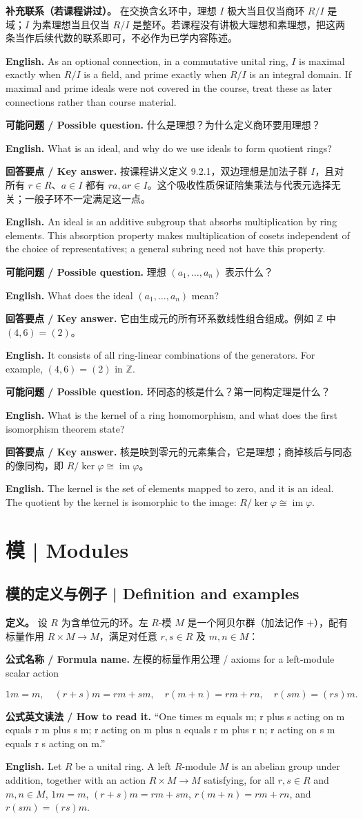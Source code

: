 \documentclass[UTF8,11pt,a4paper]{ctexart}
\newcommand{\EN}[1]{\par\noindent\textbf{English.} #1\par}
\newcommand{\READ}[1]{\par\noindent\textbf{公式英文读法 / How to read it.} #1\par}
\newcommand{\FORMULA}[2]{\par\noindent\textbf{公式名称 / Formula name.} #1 / #2\par}
\newcommand{\ASK}[4]{\par\noindent\textbf{可能问题 / Possible question.} #1\par\EN{#2}\noindent\textbf{回答要点 / Key answer.} #3\par\EN{#4}\medskip}
\begin{document}
\noindent\textbf{补充联系（若课程讲过）。} 在交换含幺环中，理想 $I$ 极大当且仅当商环 $R/I$ 是域；$I$ 为素理想当且仅当 $R/I$ 是整环。若课程没有讲极大理想和素理想，把这两条当作后续代数的联系即可，不必作为已学内容陈述。
\EN{As an optional connection, in a commutative unital ring, $I$ is maximal exactly when $R/I$ is a field, and prime exactly when $R/I$ is an integral domain. If maximal and prime ideals were not covered in the course, treat these as later connections rather than course material.}

\ASK{什么是理想？为什么定义商环要用理想？}{What is an ideal, and why do we use ideals to form quotient rings?}{按课程讲义定义 9.2.1，双边理想是加法子群 $I$，且对所有 $r\in R$、$a\in I$ 都有 $ra,ar\in I$。这个吸收性质保证陪集乘法与代表元选择无关；一般子环不一定满足这一点。}{An ideal is an additive subgroup that absorbs multiplication by ring elements. This absorption property makes multiplication of cosets independent of the choice of representatives; a general subring need not have this property.}

\ASK{理想 $(a_1,\ldots,a_n)$ 表示什么？}{What does the ideal $(a_1,\ldots,a_n)$ mean?}{它由生成元的所有环系数线性组合组成。例如 $\mathbb Z$ 中 $(4,6)=(2)$。}{It consists of all ring-linear combinations of the generators. For example, $(4,6)=(2)$ in $\mathbb Z$.}

\ASK{环同态的核是什么？第一同构定理是什么？}{What is the kernel of a ring homomorphism, and what does the first isomorphism theorem state?}{核是映到零元的元素集合，它是理想；商掉核后与同态的像同构，即 $R/\ker\varphi\cong\operatorname{im}\varphi$。}{The kernel is the set of elements mapped to zero, and it is an ideal. The quotient by the kernel is isomorphic to the image: $R/\ker\varphi\cong\operatorname{im}\varphi$.}

\section{模 | Modules}
\subsection{模的定义与例子 | Definition and examples}
\noindent\textbf{定义。} 设 $R$ 为含单位元的环。左 $R$-模 $M$ 是一个阿贝尔群（加法记作 $+$），配有标量作用 $R\times M\to M$，满足对任意 $r,s\in R$ 及 $m,n\in M$：
\FORMULA{左模的标量作用公理}{axioms for a left-module scalar action}
\[
1m=m,\quad (r+s)m=rm+sm,\quad r(m+n)=rm+rn,\quad r(sm)=(rs)m.
\]
\READ{“One times m equals m; r plus s acting on m equals r m plus s m; r acting on m plus n equals r m plus r n; r acting on s m equals r s acting on m.”}
\EN{Let $R$ be a unital ring. A left $R$-module $M$ is an abelian group under addition, together with an action $R\times M\to M$ satisfying, for all $r,s\in R$ and $m,n\in M$, $1m=m$, $(r+s)m=rm+sm$, $r(m+n)=rm+rn$, and $r(sm)=(rs)m$.}
\end{document}
